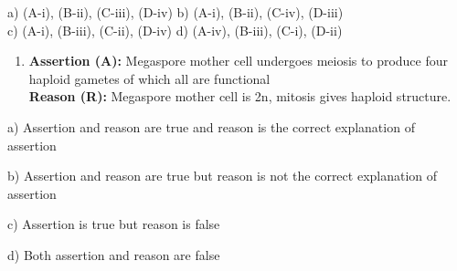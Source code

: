 a) (A-i), (B-ii), (C-iii), (D-iv) b) (A-i), (B-ii), (C-iv), (D-iii)\\
c) (A-i), (B-iii), (C-ii), (D-iv) d) (A-iv), (B-iii), (C-i), (D-ii)

\begin{enumerate}
\def\labelenumi{\arabic{enumi}.}
\setcounter{enumi}{17}
\item
  \textbf{Assertion (A):} Megaspore mother cell undergoes meiosis to
  produce four haploid gametes of which all are functional\\
  \textbf{Reason (R):} Megaspore mother cell is 2n, mitosis gives
  haploid structure.
\end{enumerate}

a) Assertion and reason are true and reason is the correct explanation
of assertion

b) Assertion and reason are true but reason is not the correct
explanation of assertion

c) Assertion is true but reason is false

d) Both assertion and reason are false
\item
\begin{enumerate}
\def\labelenumi{\arabic{enumi}.}
\setcounter{enumi}{147}
\end{enumerate}
